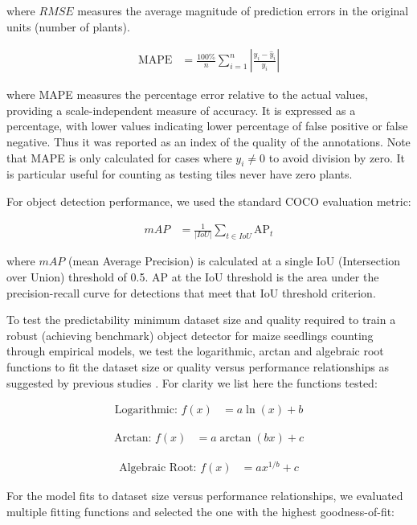 \documentclass[journal,article,submit,pdftex,moreauthors]{Definitions/mdpi}
\begin{document}
where $RMSE$ measures the average magnitude of prediction errors in the original 
units (number of plants).

\begin{align}
\text{MAPE} &= \frac{100\%}{n}\sum_{i=1}^{n} \left| \frac{y_i - \hat{y}_i}{y_i} \right|
\end{align}

where MAPE measures the percentage error relative to the actual values, providing a scale-independent 
measure of accuracy. It is expressed as a percentage, with lower values indicating lower
percentage of false positive or false negative.
Thus it was reported as an index of the quality of the annotations.
Note that MAPE is only calculated for cases where $y_i \neq 0$ to avoid division by zero.
It is particular useful for counting as testing tiles never have zero plants.

For object detection performance, we used the standard COCO evaluation metric:

\begin{align}
\text{$mAP$} &= \frac{1}{|IoU|}\sum_{t \in IoU}\text{AP}_t
\end{align}

where $mAP$ (mean Average Precision) is calculated at a single IoU (Intersection over Union) 
threshold of 0.5.
AP at the IoU threshold is the area under the precision-recall curve for detections 
that meet that IoU threshold criterion.

To test the predictability minimum dataset size and quality required to train a robust
(achieving benchmark) object detector for maize seedlings counting through empirical 
models, we test the logarithmic, arctan and algebraic root functions to fit the 
dataset size or quality versus performance relationships as suggested by previous
studies \cite{mahmoodHowMuchMore2022}. 
For clarity we list here the functions tested:


\begin{align}
\text{Logarithmic: } f(x) &= a \ln(x) + b
\end{align}

\begin{align}
\text{Arctan: } f(x) &= a \arctan(bx) + c
\end{align}

\begin{align}
\text{Algebraic Root: } f(x) &= a x^{1/b} + c
\end{align}

For the model fits to dataset size versus performance relationships, we evaluated 
multiple fitting functions and selected the one with the highest goodness-of-fit:
\end{document}
